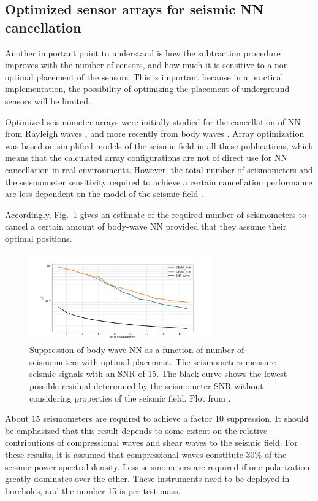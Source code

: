 \subsection{Optimized sensor arrays for seismic NN cancellation}
\label{sub:optimization}

Another important point to understand is how the subtraction procedure improves with the number of sensors, and how much it is sensitive to a non optimal placement of the sensors. This is important because in a practical implementation, the possibility of optimizing the placement of underground sensors will be limited. 

Optimized seismometer arrays were initially studied for the cancellation of NN from Rayleigh waves \cite{DHA2012,Har2015,CoEA2016a}, and more recently from body waves \cite{BaHa2019}. Array optimization was based on simplified models of the seismic field in all these publications, which means that the calculated array configurations are not of direct use for NN cancellation in real environments. However, the total number of seismometers and the seismometer sensitivity required to achieve a certain cancellation performance are less dependent on the model of the seismic field \cite{CoEA2016a}. 

Accordingly, Fig.~\ref{fig:residualN} gives an estimate of the required number of seismometers to cancel a certain amount of body-wave NN provided that they assume their optimal positions. 
\begin{figure}[t!]
	\begin{center} 
		\includegraphics[width=0.7\textwidth]{SiteInfra/SiteRequirements/NewtonianNoise/NewtonianNoiseFigures/SNR_ch3.png}
		\caption{Suppression of body-wave NN as a function of number of seismometers with optimal placement. The seismometers measure seismic signals with an SNR of 15. The black curve shows the lowest possible residual determined by the seismometer SNR without considering properties of the seismic field. Plot from \cite{BaHa2019}.} 
		 \label{fig:residualN} 
	\end{center}
\end{figure}
About 15 seismometers are required to achieve a factor 10 suppression. It should be emphasized that this result depends to some extent on the relative contributions of compressional waves and shear waves to the seismic field. For these results, it is assumed that compressional waves constitute 30\% of the seismic power-spectral density. Less seismometers are required if one polarization greatly dominates over the other. These instruments need to be deployed in boreholes, and the number 15 is per test mass. 

